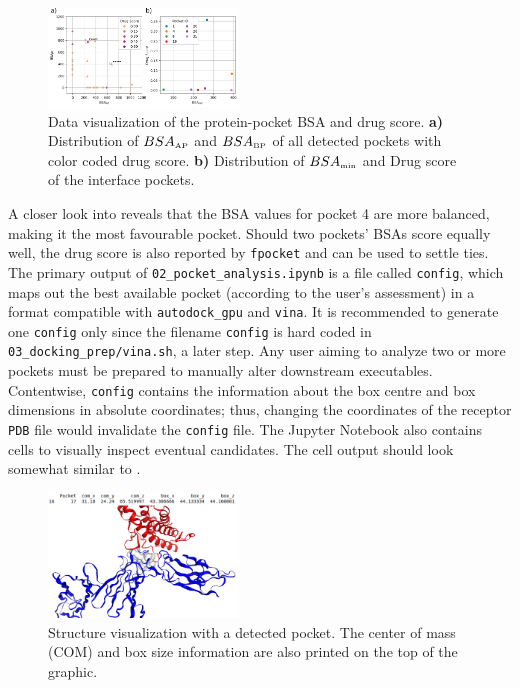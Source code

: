 \documentclass[9pt,tutorial]{livecoms}
\newcommand{\code}[1]{\colorbox{light-gray}{\texttt{#1}}}
\begin{document}
\begin{figure}[H]
\centering
\includegraphics[width=0.45\textwidth]{figures/BSA_drugscore.png}
\caption{Data visualization of the protein-pocket BSA and drug score. \textbf{a)} Distribution of $BSA_\text{\tiny AP}$ and $BSA_\text{\tiny BP}$ of all detected pockets with color coded drug score. \textbf{b)} Distribution of $BSA_\text{\tiny min}$ and Drug score of the interface pockets.}
\label{fig:BSA_drugscore}
\end{figure}

A closer look into  reveals that the BSA values for pocket 4 are more balanced, making it the most favourable pocket. Should two pockets' BSAs score equally well, the drug score is also reported by \code{fpocket} and can be used to settle ties. The primary output of \code{02\_pocket\_analysis.ipynb} is a file called \code{config}, which maps out the best available pocket (according to the user's assessment) in a format compatible with \code{autodock\_gpu} and \code{vina}. It is recommended to generate one \code{config} only since the filename \code{config} is hard coded in \code{03\_docking\_prep/vina.sh}, a later step. Any user aiming to analyze two or more pockets must be prepared to manually alter downstream executables. Contentwise, \code{config} contains the information about the box centre and box dimensions in absolute coordinates; thus, changing the coordinates of the receptor \texttt{PDB} file would invalidate the \code{config} file. The Jupyter Notebook also contains cells to visually inspect eventual candidates. The cell output should look somewhat similar to . 

\begin{figure}[H]
\centering
\includegraphics[width=0.45\textwidth]{figures/visualize_pocket_3hmx.png}
\caption{Structure visualization with a detected pocket. The center of mass (COM) and box size information are also printed on the top of the graphic.}
\label{fig:pocket_visualization_3hmx}
\end{figure}
\end{document}
